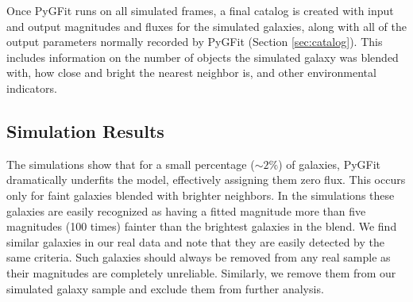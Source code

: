 \documentclass[apj]{emulateapj}
\newcommand{\pygfit}{PyGFit}
\begin{document}
Once \pygfit{} runs on all simulated frames, a final catalog is created with input and output magnitudes and fluxes for the simulated galaxies, along with all of the output parameters normally recorded by \pygfit{} (Section \ref{sec:catalog}).  This includes information on the number of objects the simulated galaxy was blended with, how close and bright the nearest neighbor is, and other environmental indicators.

\subsection{Simulation Results}

\begin{figure*}
\caption{(Top) Input magnitude versus input magnitude minus output magnitude as measured by \pygfit{} simulations for three filters: R (left), J (center), and $3.6\mu$m (right).  (Bottom) Magnitude error as a function of magnitude.  The solid circles show the uncertainty of \pygfit{}'s magnitude estimates in magnitude bins.  For comparison the open circles show the resulting error when a $4^{\prime\prime}$ diameter aperture-magnitude is used instead of \pygfit{}.  The solid line shows the uncertainty introduced by sky noise for an aperture with a $4^{\prime\prime}$ diameter.}\label{fig:mag_sims}
\end{figure*}

\begin{figure*}
\caption{Difference between input and output magnitude for simulated galaxies as a function of flux ratio (left) and separation relative to the size of the PSF (right).  To cleanly separate the two competing effects the left panel only includes galaxies separated by at least 1 PSF FWHM, and the right panel only includes galaxies which are the brightest galaxy in the pair.}\label{fig:close_sim}
\end{figure*}

The simulations show that for a small percentage ($\sim2\%$) of galaxies, \pygfit{} dramatically underfits the model, effectively assigning them zero flux.  This occurs only for faint galaxies blended with brighter neighbors. In the simulations these galaxies are easily recognized as having a fitted magnitude more than five magnitudes (100 times) fainter than the brightest galaxies in the blend. 
We find similar galaxies in our real data and note that they are easily detected by the same criteria.  Such galaxies should always be removed from any real sample as their magnitudes are completely unreliable.  Similarly, we remove them from our simulated galaxy sample and exclude them from further analysis.
\end{document}
